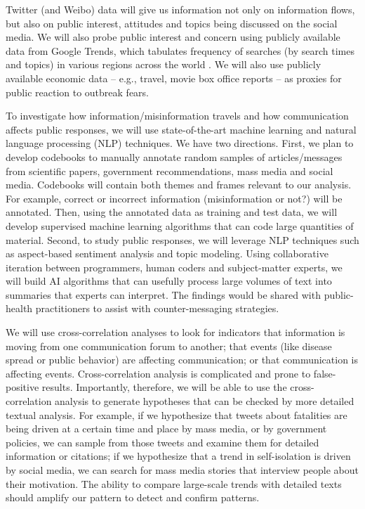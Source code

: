 Twitter (and Weibo) data will give us information not only on information flows, but also on public interest, attitudes and topics being discussed on the social media. We will also probe public interest and concern using publicly available data from Google Trends, which tabulates frequency of searches (by search times and topics) in various regions across the world \cite{BousAgac17, MahrBrag19}.
We will also use publicly available economic data -- e.g., travel, movie box office reports -- as proxies for public reaction to outbreak fears. 



To investigate how information/misinformation travels and how communication affects public responses, we will use state-of-the-art machine learning and natural language processing (NLP) techniques. We have two directions. First, we plan to develop codebooks to manually annotate random samples of articles/messages from scientific papers, government recommendations, mass media and social media. Codebooks will contain both themes and frames relevant to our analysis. For example, correct or incorrect information (misinformation or not?) will be annotated. Then, using the annotated data as training and test data, we will develop supervised machine learning algorithms that can code large quantities of material. Second, to study public responses, we will leverage NLP techniques such as aspect-based sentiment analysis and topic modeling. Using collaborative iteration between programmers, human coders and subject-matter experts, we will build AI algorithms that can usefully process large volumes of text into summaries that experts can interpret. The findings would be shared with public-health practitioners to assist with counter-messaging strategies. 


We will use cross-correlation analyses to look for indicators that information is moving from one communication forum to another; that events (like disease spread or public behavior) are affecting communication; or that communication is affecting events. 
Cross-correlation analysis is complicated and prone to false-positive results. Importantly, therefore, we will be able to use the cross-correlation analysis to generate hypotheses that can be checked by more detailed textual analysis. For example, if we hypothesize that tweets about fatalities are being driven at a certain time and place by mass media, or by government policies, we can sample from those tweets and examine them for detailed information or citations; if we hypothesize that a trend in self-isolation is driven by social media, we can search for mass media stories that interview people about their motivation. The ability to compare large-scale trends with detailed texts should amplify our pattern to detect and confirm patterns. 

